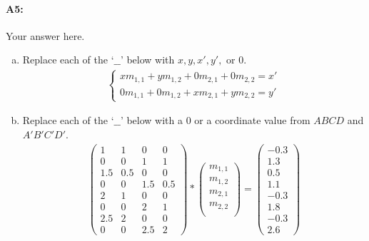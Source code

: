 \paragraph{A5:} Your answer here.

\begin{enumerate}[(a)]

    \item Replace each of the `$\_\_$' below with $x, y, x', y',$ or $0$.
          \begin{align}
              \begin{cases}
                  xm_{1,1} + ym_{1,2} + 0m_{2,1} + 0m_{2,2} = x' \\
                  0m_{1,1} + 0m_{1,2} + xm_{2,1} + ym_{2,2} = y'
              \end{cases}
          \end{align}

    \item Replace each of the `$\_\_$' below with a $0$ or a coordinate value from $ABCD$ and $A'B'C'D'$.
          \begin{align}
              \begin{pmatrix} 1 & 1 & 0 & 0 \\ 0 & 0 & 1 & 1 \\ 1.5 & 0.5 & 0 & 0 \\ 0 & 0 & 1.5 & 0.5 \\ 2 & 1 & 0 & 0 \\ 0 & 0 & 2 & 1 \\ 2.5 & 2 & 0 & 0 \\ 0 & 0 & 2.5 & 2\end{pmatrix} *\begin{pmatrix} m_{1,1} \\ m_{1,2} \\ m_{2,1} \\ m_{2,2} \\ \end{pmatrix} = \begin{pmatrix} -0.3 \\ 1.3 \\ 0.5 \\ 1.1 \\ -0.3 \\ 1.8 \\ -0.3 \\ 2.6 \end{pmatrix}
          \end{align}


\end{enumerate}
